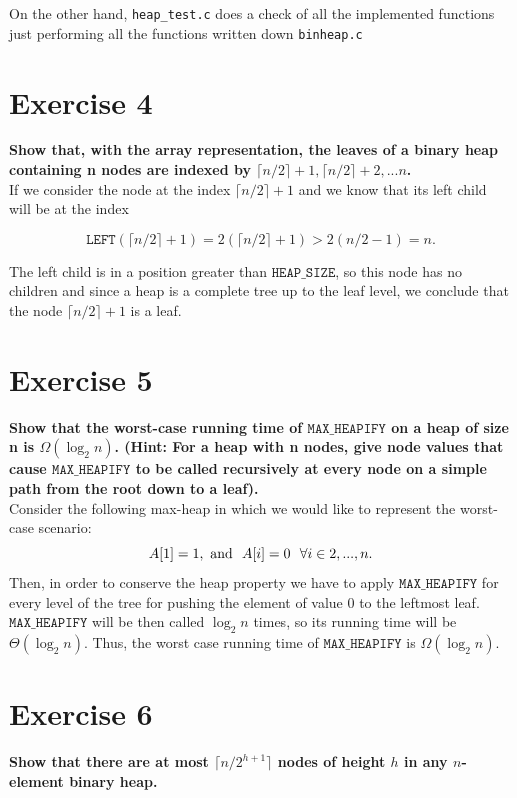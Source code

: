 \documentclass{article}
\begin{document}
	On the other hand, \texttt{heap\_test.c} does a check of all the implemented functions just performing all the functions written down \texttt{binheap.c}
	
	\section*{Exercise 4}
	\textbf{Show that, with the array representation, the leaves of a
	binary heap containing n nodes are indexed by $\lceil n/2 \rceil + 1, \lceil n/2 \rceil + 2, . . . n$.} \\



	\noindent If we consider the node at the index $ \lceil n/2 \rceil +1$ and we know that its left child will be at the index 
	
	$$ 
	\mathtt{LEFT}( \lceil n/2 \rceil +1 ) = 2(\lceil n/2 \rceil +1) > 2(n/2 - 1) = n.
	$$
	
	The left child is in a position greater than $\mathtt{HEAP\_SIZE}$, so this node has no children and since a heap is a complete tree up to the leaf level, we conclude that the node $ \lceil n/2 \rceil +1$ is a leaf.
	
	\section*{Exercise 5}
	\textbf{Show that the worst-case running time of $\mathtt{MAX\_HEAPIFY}$ on a heap of size n is $\Omega(\log_2 n)$.  (Hint: For a heap with n nodes, give node values that cause $\mathtt{MAX\_HEAPIFY}$ to be called recursively at every node on a simple path from the root down to a leaf).} \\
	
	\noindent Consider the following max-heap in which we would like to represent the worst-case scenario:
	$$
	A[1] = 1, ~ \textmd{and} ~~ A[i] = 0 ~~ \forall i \in {2,..., n}.
	$$
	Then, in order to conserve the heap property we have to apply $\mathtt{MAX\_HEAPIFY}$ for every level of the tree  for pushing the element of value 0 to the leftmost leaf. $\mathtt{MAX\_HEAPIFY}$ will be then called $\log_2n$ times, so its running time will be $\Theta (\log_2n)$. Thus, the worst case running time of $\mathtt{MAX\_HEAPIFY}$ is $\Omega(\log_2n)$.
	
	\section*{Exercise 6}
	\textbf{Show that there are at most $\lceil n/2^{h+1} \rceil$ nodes of height $h$ in any $n$-element binary heap.} \\
	
\end{document}
